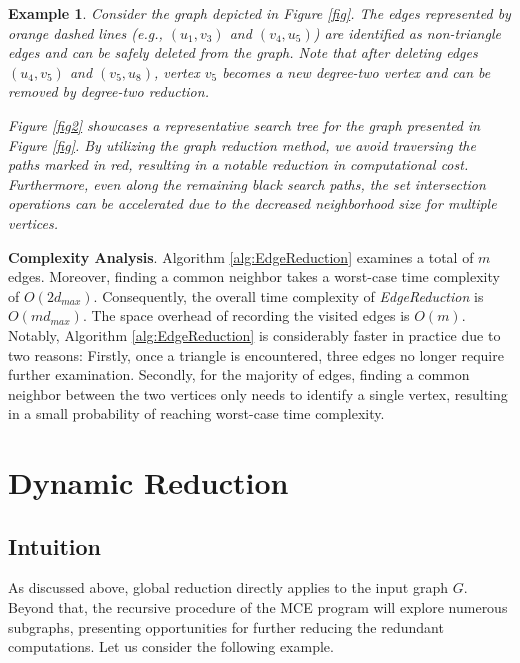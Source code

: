 \documentclass[sigconf, nonacm]{acmart}
\newtheorem{exmp}{Example}%
\begin{document}
\begin{exmp} 
\textit{
Consider the graph depicted in Figure \ref{fig}. %
The edges represented by orange dashed lines (e.g., $(u_1,v_3)$ and $(v_4,u_5)$) are identified as non-triangle edges and can be safely deleted from the graph. Note that after deleting edges $(u_4,v_5)$ and $(v_5,u_8)$, vertex $v_5$ becomes a new degree-two vertex and can be removed by degree-two reduction. }

\textit{
Figure \ref{fig2} showcases a representative search tree for the graph presented in Figure \ref{fig}. By utilizing the graph reduction method, we avoid traversing the paths marked in red, resulting in a notable reduction in computational cost. Furthermore, even along the remaining black search paths, the set intersection operations %
can be accelerated due to the decreased neighborhood size for multiple vertices. 
}
\end{exmp}

\noindent\textbf{Complexity Analysis}. Algorithm \ref{alg:EdgeReduction} examines a total of $m$ edges. Moreover, finding a common neighbor takes a worst-case time complexity of $O(2d_{max})$. Consequently, the overall time complexity of \textit{EdgeReduction} is $O(md_{max})$. %
The space overhead of recording the visited edges is $O(m)$.
Notably, Algorithm \ref{alg:EdgeReduction} is considerably faster in practice due to two reasons: Firstly, once a triangle is encountered, three edges no longer require further examination. Secondly, for the majority of edges, finding a common neighbor between the two vertices only needs to identify a single vertex, resulting in a small probability of reaching worst-case time complexity.





\section{Dynamic Reduction}\label{sec5}

\subsection{Intuition}

As discussed above, global reduction directly applies to the input graph $G$. Beyond that, the recursive procedure of the MCE program will explore numerous subgraphs, presenting opportunities for further reducing the redundant computations. Let us consider the following example.
\end{document}
